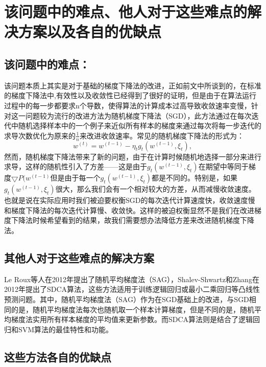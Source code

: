 \documentclass[12pt, a4paper, oneside]{ctexart}
\begin{document}
\newpage

\section{该问题中的难点、他人对于这些难点的解决方案以及各自的优缺点}

\subsection{ 该问题中的难点：}

该问题本质上其实是对于基础的梯度下降法的改进，正如前文中所谈到的，在标准的梯度下降法中,有效性以及收敛性已经得到了很好的证明，但是由于在算法运行过程中的每一步都要求n个导数，使得算法的计算成本过高导致收敛速率变慢，针对这一问题较为流行的改进方法为随机梯度下降法（SGD），此方法通过在每次迭代中随机选择样本中的一个例子来近似所有样本的梯度来通过每次将每一步迭代的求导次数优化为原来的$\frac{1}{n}$来改进收敛速率。常见的随机梯度下降法的形式为：
\begin{equation}
w^{(t)}=w^{(t-1)}-\eta_t g_t(w^{(t-1)},\xi _t),
\end{equation}
然而，随机梯度下降法带来了新的问题，由于在计算时候随机地选择一部分来进行求导，这样的随机性引入了方差——这是由于$g_t(w^{(t-1)},\xi_t)$在期望中等同于梯度$\bigtriangledown P(w^{(t-1)}$但是由于每一个$g_t(w^{(t-1)},\xi_t)$都是不同的。特别是，如果$g_t(w^{(t-1)},\xi_t)$很大，那么我们会有一个相对较大的方差，从而减慢收敛速度。也就是说在实际应用时我们被迫要权衡SGD的每次迭代计算速度快，收敛速度慢和梯度下降法的每次迭代计算慢、收敛快。这样的被迫权衡显然不是我们在改进梯度下降法时候希望看到的结果，故我们需要想办法降低方差来改进随机梯度下降法。
\\[8pt]
\subsection{其他人对于这些难点的解决方案}

Le Roux等人在2012年提出了随机平均梯度法（SAG），Shalev-Shwartz和Zhang在2012年提出了SDCA算法，这些方法适用于训练逻辑回归或最小二乘回归等凸线性预测问题。其中，随机平均梯度法（SAG）作为在SGD基础上的改进，与SGD相同的是，随机平均梯度法每次也随机取一个样本计算梯度，但是不同的是，随机平均梯度法实用所有样本梯度的平均值来更新参数。而SDCA算法则是结合了逻辑回归和SVM算法的最佳特性和功能。
\\[8pt]
\subsection{这些方法各自的优缺点}
\end{document}
